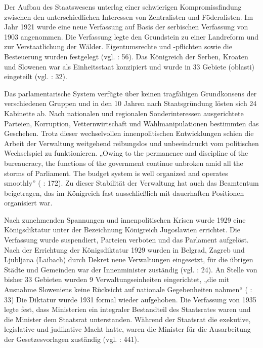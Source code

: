 \par
Der Aufbau des Staatswesens unterlag einer schwierigen Kompromissfindung zwischen den unterschiedlichen Interessen von Zentralisten und Föderalisten. Im Jahr 1921 wurde eine neue Verfassung auf Basis der serbischen Verfassung von 1903 angenommen. Die Verfassung legte den Grundstein zu einer Landreform und zur Verstaatlichung der Wälder. Eigentumsrechte und -pflichten sowie die Besteuerung wurden festgelegt (vgl. \cite{beardradin} : 56). Das Königreich der Serben, Kroaten und Slowenen war als Einheitsstaat konzipiert und wurde in 33 Gebiete (oblasti) eingeteilt (vgl. \cite{beckm90} : 32).\par
Das parlamentarische System verfügte über keinen tragfähigen Grundkonsens der verschiedenen Gruppen und in den 10 Jahren nach Staatsgründung lösten sich 24 Kabinette ab. Nach nationalen und regionalen Sonderinteressen ausgerichtete Parteien, Korruption, Vetternwirtschaft und Wahlmanipulationen bestimmten das Geschehen. Trotz dieser wechselvollen innenpolitischen Entwicklungen schien die Arbeit der Verwaltung weitgehend reibungslos und unbeeindruckt vom politischen Wechselspiel zu funktionieren. „Owing to the permanence and discipline of the bureaucracy, the functions of the government continue unbroken amid all the storms of Parliament. The budget system is well organized and operates smoothly” (\cite{beardradin} : 172). Zu dieser Stabilität der Verwaltung hat auch das Beamtentum beigetragen, das im Königreich fast ausschließlich mit dauerhaften Positionen organisiert war.\par
Nach zunehmenden Spannungen und innenpolitischen Krisen wurde 1929 eine Königsdiktatur unter der Bezeichnung Königreich Jugoslawien errichtet. Die Verfassung wurde suspendiert, Parteien verboten und das Parlament aufgelöst. Nach der Errichtung der Königsdiktatur 1929 wurden in Belgrad, Zagreb und Ljubljana (Laibach) durch Dekret neue Verwaltungen eingesetzt, für die übrigen Städte und Gemeinden war der Innenminister zuständig (vgl. \cite{libal} : 24). An Stelle von bisher 33 Gebieten wurden 9 Verwaltungseinheiten eingerichtet, „die mit Ausnahme Sloweniens keine Rücksicht auf nationale Gegebenheiten nahmen“ (\cite{beckm90} : 33) Die Diktatur wurde 1931 formal wieder aufgehoben. Die Verfassung von 1935 legte fest, dass Ministerien ein integraler Bestandteil des Staatsrates waren und die Minister dem Staatsrat unterstanden. Während der Staatsrat die exekutive, legislative und judikative Macht hatte, waren die Minister für die Ausarbeitung der Gesetzesvorlagen zuständig (vgl. \cite{kinhil} : 441).

